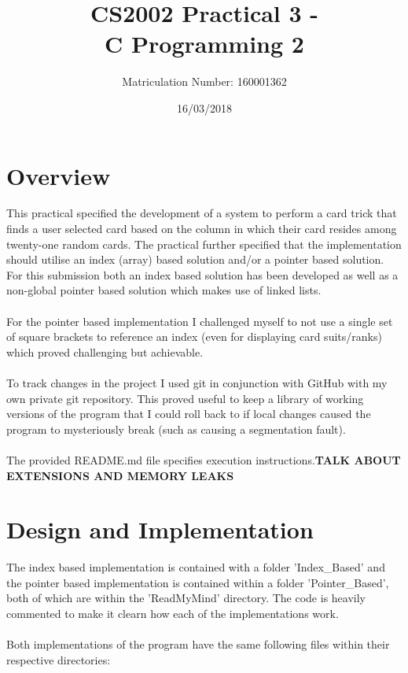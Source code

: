 \documentclass[11]{article}
\title{CS2002 Practical 3 - \\C Programming 2}
\date{16/03/2018}
\author{Matriculation Number: 160001362}
\begin{document}
	
	\maketitle
	\newpage
	\tableofcontents
	
	\newpage
	\section{Overview}
	This practical specified the development of a system to perform a card trick that finds a user selected card based on the column in which their card resides among twenty-one random cards. The practical further specified that the implementation should utilise an index (array) based solution and/or a pointer based solution. For this submission both an index based solution has been developed as well as a non-global pointer based solution which makes use of linked lists. \\\\For the pointer based implementation I challenged myself to not use a single set of square brackets to reference an index (even for displaying card suits/ranks) which proved challenging but achievable. \\\\ To track changes in the project I used git in conjunction with GitHub with my own private git repository. This proved useful to keep a library of working versions of the program that I could roll back to if local changes caused the program to mysteriously break (such as causing a segmentation fault). \\\\ The provided README.md file specifies execution instructions.\textbf{TALK ABOUT EXTENSIONS AND MEMORY LEAKS}
	\section{Design and Implementation}
		The index based implementation is contained with a folder 'Index\_Based' and the pointer based implementation is contained within a folder 'Pointer\_Based', both of which are within the 'ReadMyMind' directory. The code is heavily commented to make it clearn how each of the implementations work. \\\\Both implementations of the program have the same following files within their respective directories:
\end{document}
